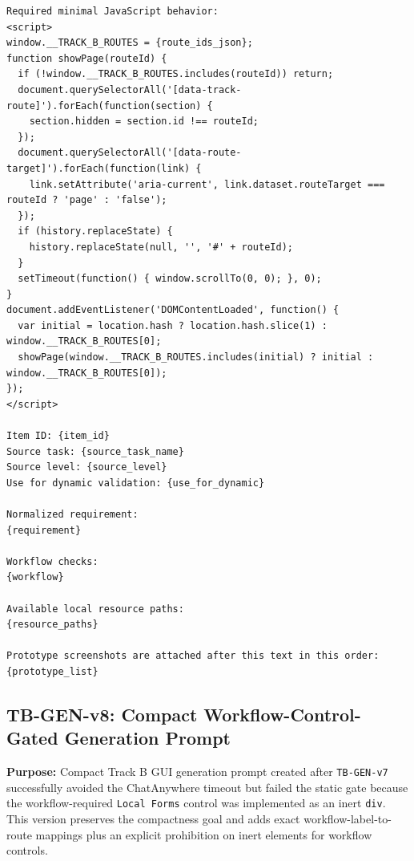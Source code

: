 \begin{verbatim}
Required minimal JavaScript behavior:
<script>
window.__TRACK_B_ROUTES = {route_ids_json};
function showPage(routeId) {
  if (!window.__TRACK_B_ROUTES.includes(routeId)) return;
  document.querySelectorAll('[data-track-route]').forEach(function(section) {
    section.hidden = section.id !== routeId;
  });
  document.querySelectorAll('[data-route-target]').forEach(function(link) {
    link.setAttribute('aria-current', link.dataset.routeTarget === routeId ? 'page' : 'false');
  });
  if (history.replaceState) {
    history.replaceState(null, '', '#' + routeId);
  }
  setTimeout(function() { window.scrollTo(0, 0); }, 0);
}
document.addEventListener('DOMContentLoaded', function() {
  var initial = location.hash ? location.hash.slice(1) : window.__TRACK_B_ROUTES[0];
  showPage(window.__TRACK_B_ROUTES.includes(initial) ? initial : window.__TRACK_B_ROUTES[0]);
});
</script>

Item ID: {item_id}
Source task: {source_task_name}
Source level: {source_level}
Use for dynamic validation: {use_for_dynamic}

Normalized requirement:
{requirement}

Workflow checks:
{workflow}

Available local resource paths:
{resource_paths}

Prototype screenshots are attached after this text in this order:
{prototype_list}
\end{verbatim}
\endgroup

\subsection{TB-GEN-v8: Compact Workflow-Control-Gated Generation Prompt}
\label{app:prompt-tb-gen-v8}

\textbf{Purpose:} Compact Track B GUI generation prompt created after
\texttt{TB-GEN-v7} successfully avoided the ChatAnywhere timeout but failed
the static gate because the workflow-required \texttt{Local Forms} control was
implemented as an inert \texttt{div}. This version preserves the compactness
goal and adds exact workflow-label-to-route mappings plus an explicit
prohibition on inert elements for workflow controls.

